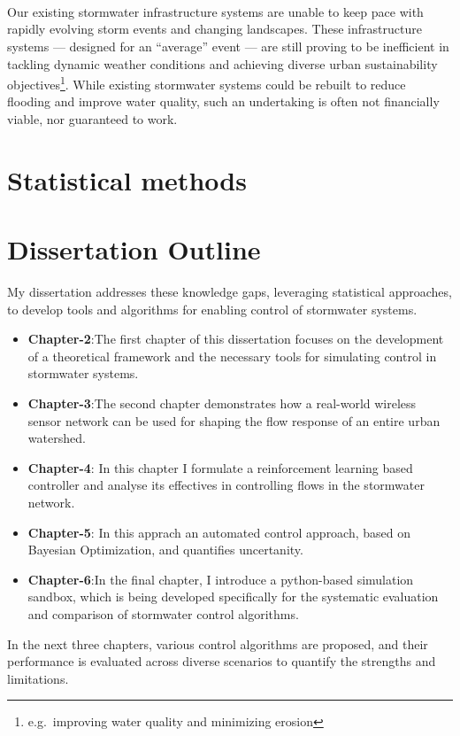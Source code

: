 \


\


\

Our existing stormwater infrastructure systems are unable to keep pace with rapidly evolving storm events and changing landscapes.
These infrastructure systems --- designed for an ``average'' event --- are still proving to be inefficient in tackling dynamic weather conditions and achieving diverse urban sustainability objectives\footnote{e.g.\ improving water quality and minimizing erosion}.
While existing stormwater systems could be rebuilt to reduce flooding and improve water quality, such an undertaking is often not financially viable, nor guaranteed to work.

\section{Statistical methods}



\section{Dissertation Outline}
My dissertation addresses these knowledge gaps, leveraging statistical approaches, to develop tools and algorithms for enabling control of stormwater systems. 

\begin{itemize}
	\item \textbf{Chapter-2}:The first chapter of this dissertation focuses on the development of a theoretical framework and the necessary tools for simulating control in stormwater systems.	
	\item \textbf{Chapter-3}:The second chapter demonstrates how a real-world wireless sensor network can be used for shaping the flow response of an entire urban watershed. 
	\item \textbf{Chapter-4}: In this chapter I formulate a reinforcement learning based controller and analyse its effectives in controlling flows in the stormwater network.
	\item \textbf{Chapter-5}: In this apprach an automated control approach, based on Bayesian Optimization, and quantifies uncertanity. 
	\item \textbf{Chapter-6}:In the final chapter, I introduce a python-based simulation sandbox, which is being developed specifically for the systematic evaluation and comparison of stormwater control algorithms.
\end{itemize}
 
In the next three chapters, various control algorithms are proposed, and their performance is evaluated across diverse scenarios to quantify the strengths and limitations.

